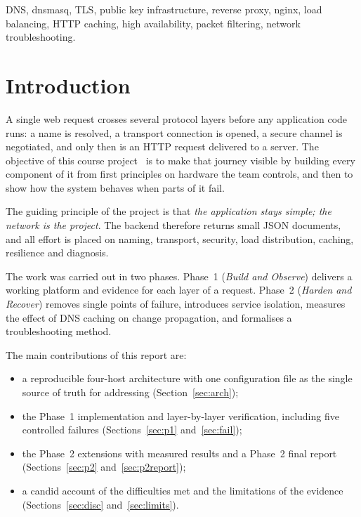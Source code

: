 \documentclass[conference,a4paper]{IEEEtran}
\begin{document}
\begin{IEEEkeywords}
DNS, dnsmasq, TLS, public key infrastructure, reverse proxy, nginx, load balancing, HTTP caching,
high availability, packet filtering, network troubleshooting.
\end{IEEEkeywords}

\section{Introduction}
A single web request crosses several protocol layers before any application
code runs: a name is resolved, a transport connection is opened, a secure channel is
negotiated, and only then is an HTTP request delivered to a server. The objective of this
course project~\cite{brief} is to make that journey visible by building every component of it
from first principles on hardware the team controls, and then to show how the system behaves
when parts of it fail.

The guiding principle of the project is that \emph{the application stays simple; the network is
the project}. The backend therefore returns small JSON documents, and all effort is placed on
naming, transport, security, load distribution, caching, resilience and diagnosis.

The work was carried out in two phases. Phase~1 (\emph{Build and Observe}) delivers a working
platform and evidence for each layer of a request. Phase~2 (\emph{Harden and Recover}) removes
single points of failure, introduces service isolation, measures the effect of DNS caching on
change propagation, and formalises a troubleshooting method.

The main contributions of this report are:
\begin{itemize}
\item a reproducible four-host architecture with one configuration file as the single source of
truth for addressing (Section~\ref{sec:arch});
\item the Phase~1 implementation and layer-by-layer verification, including five controlled
failures (Sections~\ref{sec:p1} and~\ref{sec:fail});
\item the Phase~2 extensions with measured results and a Phase~2 final report
(Sections~\ref{sec:p2} and~\ref{sec:p2report});
\item a candid account of the difficulties met and the limitations of the evidence
(Sections~\ref{sec:disc} and~\ref{sec:limits}).
\end{itemize}
\end{document}
